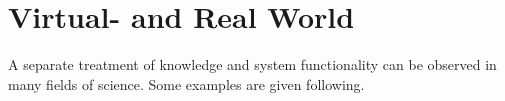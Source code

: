 %
%
%
%
%
%
%

\section{Virtual- and Real World}
\label{virtual_and_real_world_heading}

A separate treatment of knowledge and system functionality can be observed in
many fields of science. Some examples are given following.







